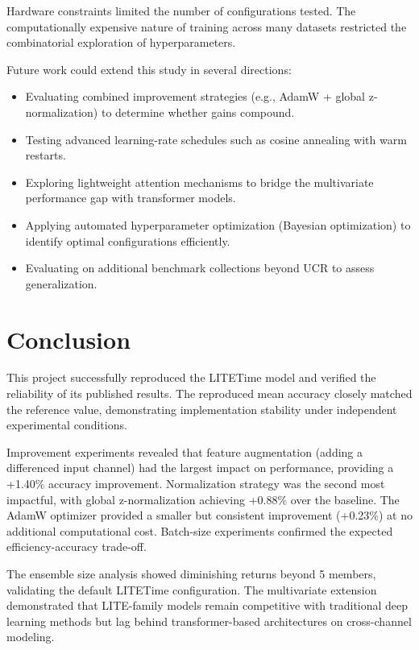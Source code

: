 \documentclass[conference]{IEEEtran}
\begin{document}
Hardware constraints limited the number of configurations tested. The computationally expensive nature of training across many datasets restricted the combinatorial exploration of hyperparameters.

Future work could extend this study in several directions:
\begin{itemize}
    \item Evaluating combined improvement strategies (e.g., AdamW + global z-normalization) to determine whether gains compound.
    \item Testing advanced learning-rate schedules such as cosine annealing with warm restarts.
    \item Exploring lightweight attention mechanisms to bridge the multivariate performance gap with transformer models.
    \item Applying automated hyperparameter optimization (Bayesian optimization) to identify optimal configurations efficiently.
    \item Evaluating on additional benchmark collections beyond UCR to assess generalization.
\end{itemize}

\section{Conclusion}

This project successfully reproduced the LITETime model and verified the reliability of its published results. The reproduced mean accuracy closely matched the reference value, demonstrating implementation stability under independent experimental conditions.

Improvement experiments revealed that feature augmentation (adding a differenced input channel) had the largest impact on performance, providing a +1.40\% accuracy improvement. Normalization strategy was the second most impactful, with global z-normalization achieving +0.88\% over the baseline. The AdamW optimizer provided a smaller but consistent improvement (+0.23\%) at no additional computational cost. Batch-size experiments confirmed the expected efficiency-accuracy trade-off.

The ensemble size analysis showed diminishing returns beyond 5 members, validating the default LITETime configuration. The multivariate extension demonstrated that LITE-family models remain competitive with traditional deep learning methods but lag behind transformer-based architectures on cross-channel modeling.
\end{document}
